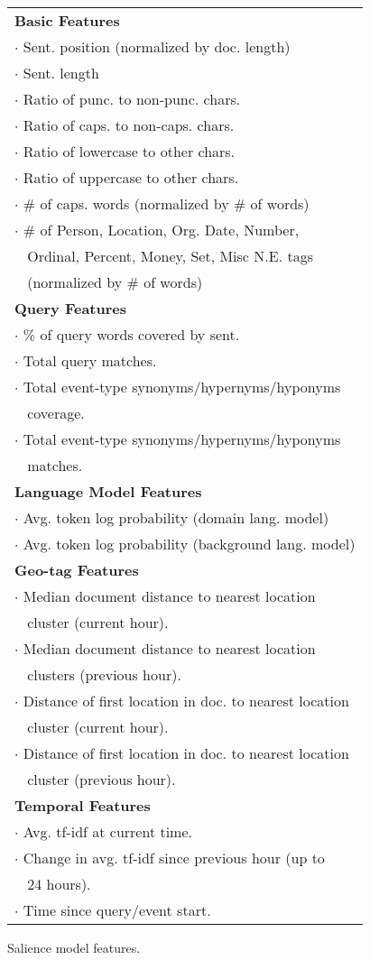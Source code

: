 \begin{figure}[t!]
\begin{tabular}{| l |} 
\hline
\textbf{Basic Features}\\
$\cdot$ Sent. position (normalized by doc. length) \\
$\cdot$ Sent. length \\
$\cdot$ Ratio of punc. to non-punc. chars. \\
$\cdot$ Ratio of caps. to non-caps. chars. \\
$\cdot$ Ratio of lowercase to other chars. \\
$\cdot$ Ratio of uppercase to other chars. \\
$\cdot$ \# of caps. words (normalized by \# of words)\\
$\cdot$ \# of Person, Location, Org. Date, Number,\\
$\;\;$ Ordinal, Percent, Money, Set, Misc  N.E. tags \\
$\;\;$ (normalized by \# of words)\\
\hline
\textbf{Query Features}\\
$\cdot$ \% of query words covered by sent.\\
$\cdot$ Total query matches.\\
$\cdot$ Total event-type synonyms/hypernyms/hyponyms\\
$\;\;$ coverage.\\
$\cdot$ Total event-type synonyms/hypernyms/hyponyms\\
$\;\;$ matches.\\
\hline
\textbf{Language Model Features}\\
$\cdot$ Avg. token log probability (domain lang. model)\\
$\cdot$ Avg. token log probability (background lang. model)\\
\hline
\textbf{Geo-tag Features}\\
$\cdot$ Median document distance to nearest location \\
$\;\;$ cluster (current hour).\\
$\cdot$ Median document distance to nearest location \\
$\;\;$ clusters (previous hour).\\
$\cdot$ Distance of first location in doc. to nearest location \\
$\;\;$ cluster (current hour).\\
$\cdot$ Distance of first location in doc. to nearest location \\
$\;\;$ cluster (previous hour).\\
\hline
\textbf{Temporal Features}\\
$\cdot$ Avg. tf-idf at current time.\\
$\cdot$ Change in avg. tf-idf since previous hour (up to\\
$\;\;$  24 hours).\\
$\cdot$ Time since query/event start.\\
\hline
\end{tabular}
\caption{Salience model features.}
\end{figure}

